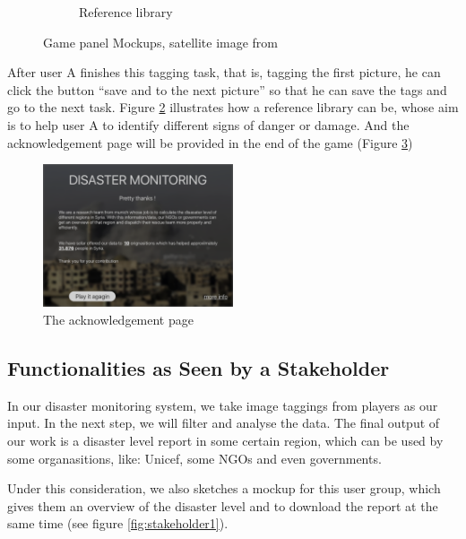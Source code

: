 \begin{figure}[H]
\begin{subfigure}[b]{0.45\textwidth}
        \caption{Reference library}
        \label{fig:player3}
    \end{subfigure}
    \caption{Game panel Mockups, satellite image from  \cite{satellite-photo-1}}
\end{figure}

After user A finishes this tagging task,
that is, 
tagging the first picture,
he can click the button ``save and to the next picture'' so that he can save the tags and go to the next task.
Figure \ref{fig:player3} illustrates how a reference library can be,
whose aim is to help user A to identify different signs of danger or damage. And the acknowledgement page will be provided in the end of the game (Figure \ref{fig:player4})

\begin{figure}[H]
\centering
\includegraphics[width=0.5\textwidth]{figures/function-player-4}
\caption{The acknowledgement page}
\label{fig:player4}
\end{figure}

\subsection{Functionalities as Seen by a Stakeholder}
In our disaster monitoring system, 
we take image taggings from players as our input. 
In the next step, 
we will filter and analyse the data.
The final output of our work is a disaster level report in some certain region,
which can be used by some organasitions,
like: Unicef, some NGOs and even governments.

Under this consideration, 
we also sketches a mockup for this user group,
which gives them an overview of the disaster level and 
to download the report at the same time (see figure \ref{fig:stakeholder1}).

